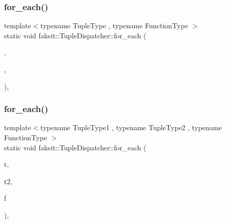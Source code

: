 \mbox{\label{structfakeit_1_1TupleDispatcher_af22c1fae8c695f722da986df9af411ca}} 
\subsubsection{\texorpdfstring{for\_each()}{for\_each()}\hspace{0.1cm}{\footnotesize\ttfamily [48/54]}}
{\footnotesize\ttfamily template$<$typename Tuple\+Type , typename Function\+Type $>$ \\
static void fakeit\+::\+Tuple\+Dispatcher\+::for\+\_\+each (\begin{DoxyParamCaption}\item[{Tuple\+Type \&\&}]{,  }\item[{Function\+Type \&}]{,  }\item[{std\+::integral\+\_\+constant$<$ size\+\_\+t, std\+::tuple\+\_\+size$<$ typename std\+::remove\+\_\+reference$<$ Tuple\+Type $>$\+::type $>$\+::value $>$}]{ }\end{DoxyParamCaption})\hspace{0.3cm}{\ttfamily [inline]}, {\ttfamily [static]}}

\mbox{\label{structfakeit_1_1TupleDispatcher_a1ddb90f24aa73dd61bf2b95c5f176cd5}} 
\subsubsection{\texorpdfstring{for\_each()}{for\_each()}\hspace{0.1cm}{\footnotesize\ttfamily [49/54]}}
{\footnotesize\ttfamily template$<$typename Tuple\+Type1 , typename Tuple\+Type2 , typename Function\+Type $>$ \\
static void fakeit\+::\+Tuple\+Dispatcher\+::for\+\_\+each (\begin{DoxyParamCaption}\item[{Tuple\+Type1 \&\&}]{t,  }\item[{Tuple\+Type2 \&\&}]{t2,  }\item[{Function\+Type \&}]{f }\end{DoxyParamCaption})\hspace{0.3cm}{\ttfamily [inline]}, {\ttfamily [static]}}

